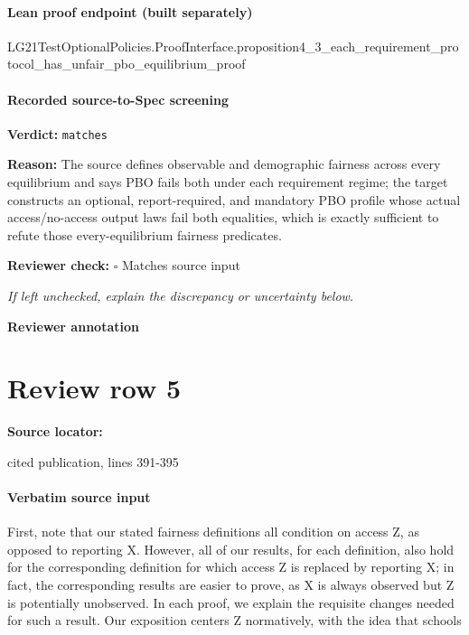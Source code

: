 \documentclass[10pt]{article}
\newcommand{\reviewerbox}{%
  \par\noindent\fbox{\parbox{0.96\linewidth}{\rule{0pt}{0.38in}}}\par
}
\newcommand{\reviewmatch}[1]{%
  \par\noindent\textbf{Reviewer check:} $\square$\; #1\par
  \noindent\emph{If left unchecked, explain the discrepancy or uncertainty below.}\par
}
\begin{document}
\paragraph{Lean proof endpoint (built separately)}\begin{ReviewVerbatim}
LG21TestOptionalPolicies.ProofInterface.proposition4_3_each_requirement_protocol_has_unfair_pbo_equilibrium_proof
\end{ReviewVerbatim}

\paragraph{Recorded source-to-Spec screening}
\textbf{Verdict:} \texttt{matches}
\\
{\raggedright
\textbf{Reason:} The source defines observable and demographic fairness across every equilibrium and says PBO fails both under each requirement regime;\allowbreak{} the target constructs an optional, report-\allowbreak{}required, and mandatory PBO profile whose actual access/\allowbreak{}no-\allowbreak{}access output laws fail both equalities, which is exactly sufficient to refute those every-\allowbreak{}equilibrium fairness predicates.\allowbreak{}
\par}
\reviewmatch{Matches source input}
\noindent\textbf{Reviewer annotation}\par
\reviewerbox
\clearpage
\hypertarget{source-claim-5ebd649546598182}{}
\section*{Review row 5}
\textbf{Source locator:} {\footnotesize\raggedright cited publication, lines 391-\allowbreak{}395\par}
\paragraph{Verbatim source input}
\begin{ReviewVerbatim}
First, note that our stated fairness deﬁnitions all condition on access Z, as opposed to reporting
X. However, all of our results, for each deﬁnition, also hold for the corresponding deﬁnition for
which access Z is replaced by reporting X; in fact, the corresponding results are easier to prove,
as X is always observed but Z is potentially unobserved. In each proof, we explain the requisite
changes needed for such a result. Our exposition centers Z normatively, with the idea that schools
\end{ReviewVerbatim}
\end{document}
